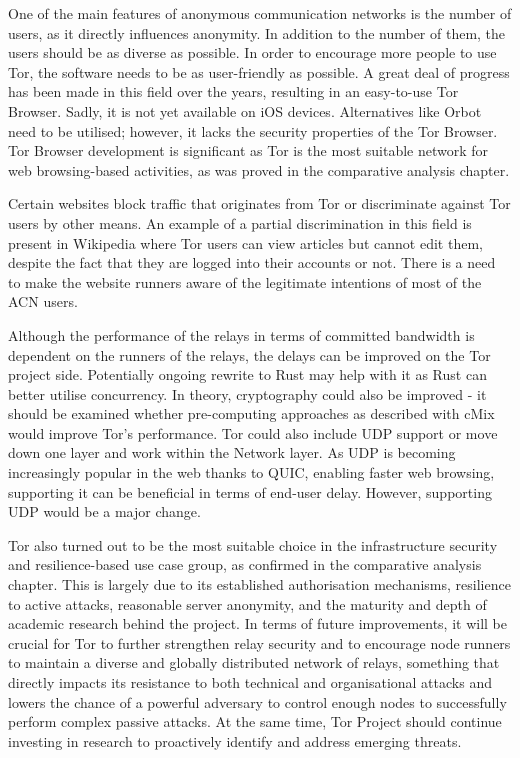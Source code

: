 One of the main features of anonymous communication networks is the number of users, as it directly influences anonymity. In addition to the number of them, the users should be as diverse as possible. In order to encourage more people to use Tor, the software needs to be as user-friendly as possible. A great deal of progress has been made in this field over the years, resulting in an easy-to-use Tor Browser. Sadly, it is not yet available on iOS devices. Alternatives like Orbot need to be utilised; however, it lacks the security properties of the Tor Browser. Tor Browser development is significant as Tor is the most suitable network for web browsing-based activities, as was proved in the comparative analysis chapter.

Certain websites block traffic that originates from Tor or discriminate against Tor users by other means. An example of a partial discrimination in this field is present in Wikipedia where Tor users can view articles but cannot edit them, despite the fact that they are logged into their accounts or not. There is a need to make the website runners aware of the legitimate intentions of most of the ACN users.

Although the performance of the relays in terms of committed bandwidth is dependent on the runners of the relays, the delays can be improved on the Tor project side. Potentially ongoing rewrite to Rust may help with it as Rust can better utilise concurrency. In theory, cryptography could also be improved - it should be examined whether pre-computing approaches as described with cMix would improve Tor’s performance. Tor could also include UDP support or move down one layer and work within the Network layer. As UDP is becoming increasingly popular in the web thanks to QUIC, enabling faster web browsing, supporting it can be beneficial in terms of end-user delay. However, supporting UDP would be a major change.

Tor also turned out to be the most suitable choice in the infrastructure security and resilience-based use case group, as confirmed in the comparative analysis chapter. This is largely due to its established authorisation mechanisms, resilience to active attacks, reasonable server anonymity, and the maturity and depth of academic research behind the project. In terms of future improvements, it will be crucial for Tor to further strengthen relay security and to encourage node runners to maintain a diverse and globally distributed network of relays, something that directly impacts its resistance to both technical and organisational attacks and lowers the chance of a powerful adversary to control enough nodes to successfully perform complex passive attacks. At the same time, Tor Project should continue investing in research to proactively identify and address emerging threats.

